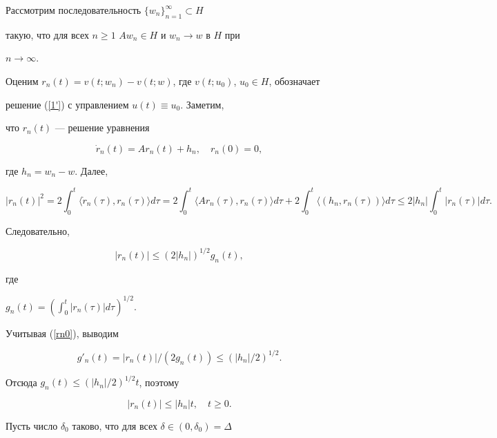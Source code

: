 \begin{pf}


Рассмотрим последовательность $\{w_n\}_{n=1}^\infty\subset H$


такую, что для всех $n\ge1$\; $Aw_n\in H$ и $w_n\to w$ в $H$ при


$n\to\infty$.


Оценим $r_n(t)=v(t;w_n)-v(t;w)$, где $v(t;u_0)$, $u_0\in H$, обозначает


решение (\ref{1'}) с управлением $u(t)\equiv u_0$. Заметим,


что $r_n(t)$ --- решение уравнения


$$


\Dot r_n(t)=Ar_n(t)+h_n,\quad r_n(0)=0,


$$


где $h_n=w_n-w$. Далее,


$$


|r_n(t)|^2=2\int_0^t\langle\Dot r_n(\tau),r_n(\tau)\rangle d\tau=


2\int_0^t\langle Ar_n(\tau),r_n(\tau)\rangle d\tau+


2\int_0^t\langle(h_n,r_n(\tau))\rangle d\tau\le


2|h_n|\int_0^t|r_n(\tau)|d\tau.


$$


Следовательно,


\begin{equation} \label{rn0}


|r_n(t)|\le(2|h_n|)^{1/2}g_n(t),


\end{equation}


где


$g_n(t)=\left(\int_0^t|r_n(\tau)|d\tau\right)^{1/2}$.


Учитывая (\ref{rn0}), выводим


$$


g'_n(t)=|r_n(t)|/(2g_n(t))\le(|h_n|/2)^{1/2}.


$$


Отсюда $g_n(t)\le(|h_n|/2)^{1/2}t$, поэтому


\begin{equation} \label{rn}


|r_n(t)|\le|h_n|t,\quad t\ge0.


\end{equation}





Пусть число $\delta_0$ таково, что для всех $\delta\in(0,\delta_0)=\Delta$



\end{pf}
